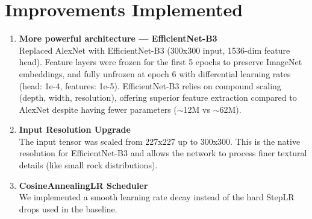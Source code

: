 \documentclass[11pt]{article}
\begin{document}
\section{Improvements Implemented}

\begin{enumerate}
    \item \textbf{More powerful architecture — EfficientNet-B3} \\
          Replaced AlexNet with EfficientNet-B3 (300x300 input, 1536-dim feature head). Feature layers were frozen for the first 5 epochs to preserve ImageNet embeddings, and fully unfrozen at epoch 6 with differential learning rates (head: 1e-4, features: 1e-5). EfficientNet-B3 relies on compound scaling (depth, width, resolution), offering superior feature extraction compared to AlexNet despite having fewer parameters ($\sim$12M vs $\sim$62M).
    \item \textbf{Input Resolution Upgrade} \\
          The input tensor was scaled from 227x227 up to 300x300. This is the native resolution for EfficientNet-B3 and allows the network to process finer textural details (like small rock distributions).
    \item \textbf{CosineAnnealingLR Scheduler} \\
          We implemented a smooth learning rate decay instead of the hard StepLR drops used in the baseline.
\end{enumerate}
\end{document}
